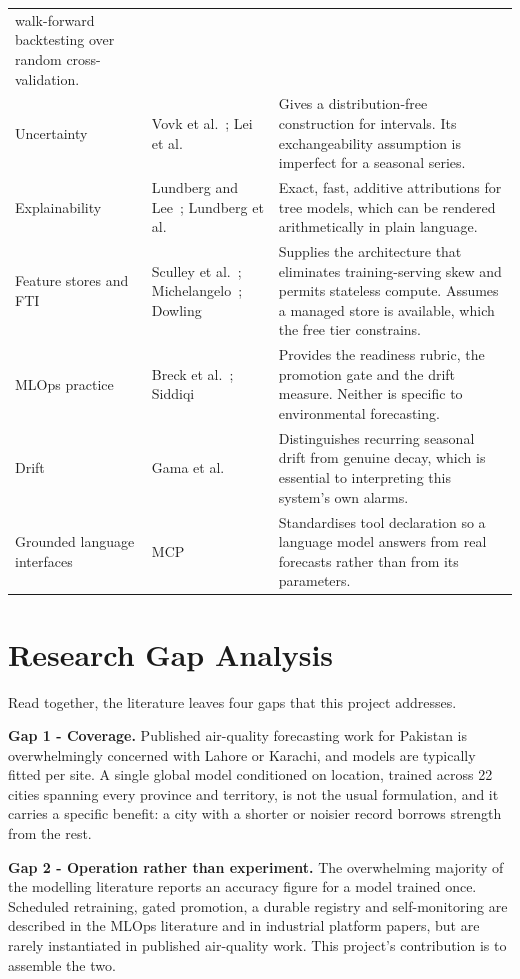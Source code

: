 \begin{xltabular}{\textwidth}{P{2.9cm} P{3.4cm} Y}
walk-forward backtesting over random cross-validation. \\
Uncertainty & Vovk et al.~\cite{ref:conformal};
Lei et al.~\cite{ref:leiconformal} & Gives a distribution-free construction for
intervals. Its exchangeability assumption is imperfect for a seasonal series. \\
Explainability & Lundberg and Lee~\cite{ref:shap};
Lundberg et al.~\cite{ref:treeshap} & Exact, fast, additive attributions for tree models,
which can be rendered arithmetically in plain language. \\
Feature stores and FTI & Sculley et al.~\cite{ref:techdebt};
Michelangelo~\cite{ref:michelangelo}; Dowling~\cite{ref:fti} & Supplies the architecture
that eliminates training-serving skew and permits stateless compute. Assumes a managed
store is available, which the free tier constrains. \\
MLOps practice & Breck et al.~\cite{ref:mltestscore};
Siddiqi~\cite{ref:siddiqi} & Provides the readiness rubric, the promotion gate and the
drift measure. Neither is specific to environmental forecasting. \\
Drift & Gama et al.~\cite{ref:driftsurvey} & Distinguishes recurring seasonal drift from
genuine decay, which is essential to interpreting this system's own alarms. \\
Grounded language interfaces & MCP~\cite{ref:mcp} & Standardises tool declaration so a
language model answers from real forecasts rather than from its parameters. \\
\end{xltabular}

\section{Research Gap Analysis}
Read together, the literature leaves four gaps that this project addresses.

\textbf{Gap 1 - Coverage.} Published air-quality forecasting work for Pakistan is
overwhelmingly concerned with Lahore or Karachi, and models are typically fitted
per site. A single global model conditioned on location, trained across 22 cities
spanning every province and territory, is not the usual formulation, and it
carries a specific benefit: a city with a shorter or noisier record borrows
strength from the rest.

\textbf{Gap 2 - Operation rather than experiment.} The overwhelming majority of
the modelling literature reports an accuracy figure for a model trained once.
Scheduled retraining, gated promotion, a durable registry and self-monitoring are
described in the MLOps literature and in industrial platform papers, but are
rarely instantiated in published air-quality work. This project's contribution is
to assemble the two.

